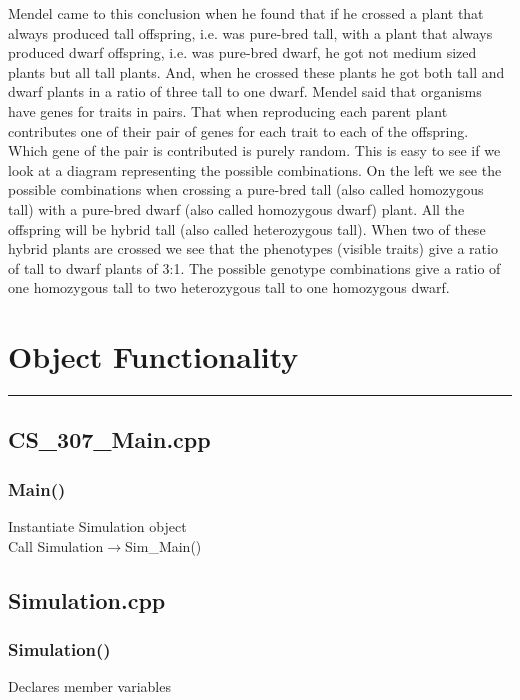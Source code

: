 \documentclass{article}
\begin{document}
Mendel came to this conclusion when he found that if he crossed a plant that always produced tall offspring, i.e. was pure-bred tall, with a plant that always produced dwarf offspring, i.e. was pure-bred dwarf, he got not medium sized plants but all tall plants. And, when he crossed these plants he got both tall and dwarf plants in a ratio of three tall to one dwarf. Mendel said that organisms have genes for traits in pairs. That when reproducing each parent plant contributes one of their pair of genes for each trait to each of the offspring. Which gene of the pair is contributed is purely random. This is easy to see if we look at a diagram representing the possible combinations. On the left we see the possible combinations when crossing a pure-bred tall (also called homozygous tall) with a pure-bred dwarf (also called homozygous dwarf) plant. All the offspring will be hybrid tall (also called heterozygous tall). When two of these hybrid plants are crossed we see that the phenotypes (visible traits) give a ratio of tall to dwarf plants of 3:1. The possible genotype combinations give a ratio of one homozygous tall to two heterozygous tall to one homozygous dwarf.




\newpage
\section{Object Functionality}
\hrule
\subsection{CS\_307\_Main.cpp}
\subsubsection{Main()}
\indent Instantiate Simulation object\\
\indent Call Simulation$\rightarrow$Sim\_Main()\\

\subsection{Simulation.cpp}
\subsubsection{Simulation()}
\indent Declares member variables
\end{document}
